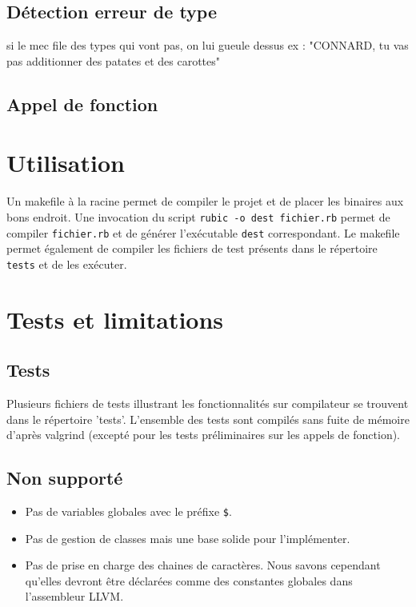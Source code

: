 \documentclass[12pt]{article}
\begin{document}
\subsection{Détection erreur de type}

si le mec file des types qui vont pas, on lui gueule dessus
ex : "CONNARD, tu vas pas additionner des patates et des carottes"

\subsection{Appel de fonction}


\section{Utilisation}

Un makefile à la racine permet de compiler le projet et de placer les binaires
aux bons endroit. Une invocation du script \verb!rubic -o dest fichier.rb!
permet de compiler \verb!fichier.rb! et de générer l'exécutable \verb!dest!
correspondant. Le makefile permet également de compiler les fichiers de test
présents dans le répertoire \verb!tests! et de les exécuter.


\section{Tests et limitations}

\subsection{Tests}

Plusieurs fichiers de tests illustrant les fonctionnalités sur compilateur se trouvent dans le répertoire 'tests'. L'ensemble des tests sont compilés sans fuite de mémoire d'après valgrind (excepté pour les tests préliminaires sur les appels de fonction).

\subsection{Non supporté}
\begin{itemize}
	\item Pas de variables globales avec le préfixe \verb!$!.
	\item Pas de gestion de classes mais une base solide pour l'implémenter.
	\item Pas de prise en charge des chaines de caractères. Nous savons cependant qu'elles devront être déclarées comme des constantes globales dans l'assembleur LLVM.
\end{itemize}
\end{document}

